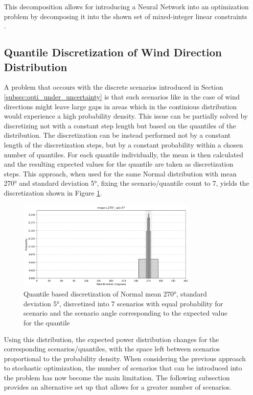 \documentclass[preprint,12pt]{elsarticle}
\begin{document}
This decomposition allows for introducing a Neural Network into an optimization problem by decomposing it into the shown set of mixed-integer linear constraints \cite{ALCANTARA2023120895}.


\subsection{Quantile Discretization of Wind Direction Distribution } \label{subsubsection: discretization}

A problem that occours with the discrete scenarios introduced in Section \ref{subsec:opti_under_uncertainty} is that such scenarios like in the case of wind directions might leave large gaps in areas which in the continious distribution would experience a high probability density. This issue can be partially solved by discretizing not with a constant step length but based on the quantiles of the distribution. The discretization can be instead performed not by a constant length of the discretization steps, but by a constant probability within a chosen number of quantiles. For each quantile individually, the mean is then calculated and the resulting expected values for the quantile are taken as discretization steps. This approach, when used for the same Normal distribution with mean 270° and standard deviation 5°, fixing the scenario/quantile count to 7, yields the discretization shown in Figure \ref{fig:wind_dist_opti_quantiles}. 

\begin{figure}[h] 
	\centering
	\includegraphics[width=0.8\textwidth]{../figures/optimization/wind_dist_opti_quantiles.png} 
	\caption{Quantile based discretization of Normal mean 270°,  standard deviation 5°, disrcetized into 7 scenarios with equal probability for scenario and the scenario angle corresponding to the expected value for the quantile }
	\label{fig:wind_dist_opti_quantiles}
\end{figure} 

Using this distribution, the expected power distribution changes for the corresponding scenarios/quantiles, with the space left between scenarios proportional to the probability density. When considering the previous approach to stochastic optimization, the number of scenarios that can be introduced into the problem has now become the main limitation. The following subsection provides an alternative set up that allows for a greater number of scenarios. 
\end{document}

